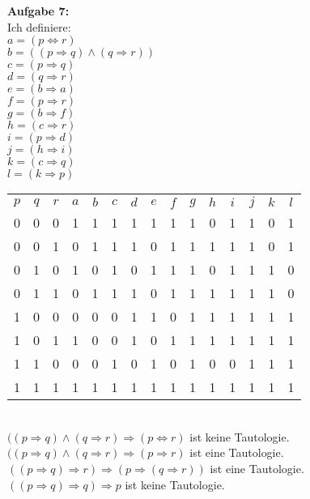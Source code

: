 \documentclass[a4paper]{scrartcl}
\begin{document}
	\begin{flushleft}
		\textbf{Aufgabe 7:}\\[1em]
		Ich definiere: \\
		$a = (p \Leftrightarrow r)$ \\
		$b = ((p \Rightarrow q) \wedge (q \Rightarrow r))$ \\
		$c = (p \Rightarrow q)$ \\
		$d = (q \Rightarrow r)$ \\
		$e = (b \Rightarrow a)$ \\
		$f = (p \Rightarrow r)$ \\
		$g = (b \Rightarrow f)$ \\
		$h = (c \Rightarrow r)$ \\
		$i = (p \Rightarrow d)$ \\
		$j = (h \Rightarrow i)$ \\
		$k = (c \Rightarrow q)$ \\
		$l = (k \Rightarrow p)$ \\[1em]
		\begin{tabular}{|c|c|c|c|c|c|c|c|c|c|c|c|c|c|c|}
			$p$ & $q$ & $r$ & $a$ & $b$ & $c$ & $ d$ & $e$ & $f$ & $g$ & $h$ & $i$ & $j$ & $k$ & $l$ \\
			0 & 0 & 0 & 1 & 1 & 1 & 1 & 1 & 1 & 1 & 0 & 1 & 1 & 0 & 1 \\
			0 & 0 & 1 & 0 & 1 & 1 & 1 & 0 & 1 & 1 & 1 & 1 & 1 & 0 & 1 \\
			0 & 1 & 0 & 1 & 0 & 1 & 0 & 1 & 1 & 1 & 0 & 1 & 1 & 1 & 0 \\
			0 & 1 & 1 & 0 & 1 & 1 & 1 & 0 & 1 & 1 & 1 & 1 & 1 & 1 & 0 \\
			1 & 0 & 0 & 0 & 0 & 0 & 1 & 1 & 0 & 1 & 1 & 1 & 1 & 1 & 1 \\
			1 & 0 & 1 & 1 & 0 & 0 & 1 & 0 & 1 & 1 & 1 & 1 & 1 & 1 & 1 \\
			1 & 1 & 0 & 0 & 0 & 1 & 0 & 1 & 0 & 1 & 0 & 0 & 1 & 1 & 1 \\
			1 & 1 & 1 & 1 & 1 & 1 & 1 & 1 & 1 & 1 & 1 & 1 & 1 & 1 & 1 \\
		 \end{tabular}\\[1em]
		 $((p \Rightarrow q) \wedge (q \Rightarrow r) \Rightarrow (p \Leftrightarrow r)$ ist keine Tautologie.\\
		 $((p \Rightarrow q) \wedge (q \Rightarrow r) \Rightarrow (p \Rightarrow r)$ ist eine Tautologie. \\
		 $((p \Rightarrow q) \Rightarrow r) \Rightarrow (p \Rightarrow (q \Rightarrow r))$ ist eine Tautologie. \\
		 $((p \Rightarrow q) \Rightarrow q) \Rightarrow p$ ist keine Tautologie. \\[1em]
 	\end{flushleft}
\end{document}
